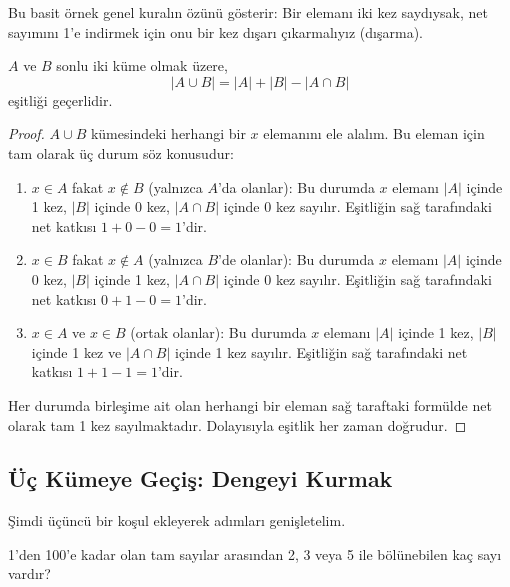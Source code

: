 Bu basit örnek genel kuralın özünü gösterir: Bir elemanı iki kez saydıysak,
net sayımını 1'e indirmek için onu bir kez dışarı çıkarmalıyız (dışarma).

\begin{theorem} $A$ ve $B$ sonlu iki küme olmak
üzere, \[ |A \cup B| = |A| + |B| - |A \cap B| \] eşitliği geçerlidir.
\end{theorem}

\begin{proof} $A \cup B$ kümesindeki herhangi bir $x$ elemanını ele alalım.
Bu eleman için tam olarak üç durum söz konusudur:
\begin{enumerate} \item $x \in A$ fakat $x \notin B$ (yalnızca $A$'da olanlar): Bu
durumda $x$ elemanı $|A|$ içinde 1 kez, $|B|$ içinde 0 kez, $|A \cap B|$ içinde 0 kez
sayılır. Eşitliğin sağ tarafındaki net katkısı $1 + 0 - 0 = 1$'dir. \item $x \in B$
fakat $x \notin A$ (yalnızca $B$'de olanlar): Bu durumda $x$ elemanı $|A|$ içinde 0 kez,
$|B|$ içinde 1 kez, $|A \cap B|$ içinde 0 kez sayılır. Eşitliğin sağ tarafındaki net
katkısı $0 + 1 - 0 = 1$'dir. \item $x \in A$ ve $x \in B$ (ortak olanlar): Bu durumda
$x$ elemanı $|A|$ içinde 1 kez, $|B|$ içinde 1 kez ve $|A \cap B|$ içinde 1 kez sayılır.
Eşitliğin sağ tarafındaki net katkısı $1 + 1 - 1 = 1$'dir. \end{enumerate} Her
durumda birleşime ait olan herhangi bir eleman sağ taraftaki formülde net olarak
tam 1 kez sayılmaktadır. Dolayısıyla eşitlik her zaman doğrudur. \end{proof}

\subsection{Üç Kümeye Geçiş: Dengeyi Kurmak}

Şimdi üçüncü bir koşul ekleyerek adımları genişletelim.

\begin{example} 1'den 100'e kadar olan tam sayılar arasından 2, 3 veya 5 ile
bölünebilen kaç sayı vardır? \end{example}

